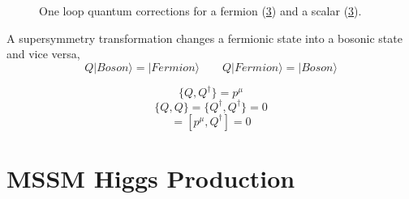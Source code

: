 \begin{figure}[hb]
  \centering
  \begin{subfigure}[trim = 0mm 0mm 0mm 0mm, clip, width=3cm]{.4\textwidth}
                \caption{}
                \label{fig:fermionLoop}
\end{subfigure}
\begin{subfigure}[trim = 0mm 0mm 0mm 0mm, clip, width=3cm]{.4\textwidth}
	\caption{}
                \label{fig:scalarLoop}
                	
  \end{subfigure}
   \caption[]{One loop quantum corrections for a fermion (\ref{fig:scalarLoop}) and a scalar (\ref{fig:scalarLoop}). }
\end{figure}

A supersymmetry transformation changes a fermionic state into a bosonic state and vice versa,
\begin{equation}
Q|Boson\rangle=|Fermion\rangle \qquad Q|Fermion\rangle=|Boson\rangle
\end{equation}

\begin{equation}
\{Q,Q^{\dagger}\}=p^{\mu}
\end{equation}
\begin{equation}
\{Q,Q\}=\{Q^{\dagger},Q^{\dagger}\}=0
\end{equation}
\begin{equation}
[p^{\mu},Q ]=[p^{\mu},Q^{\dagger}]=0
\end{equation}

\section{MSSM Higgs Production}